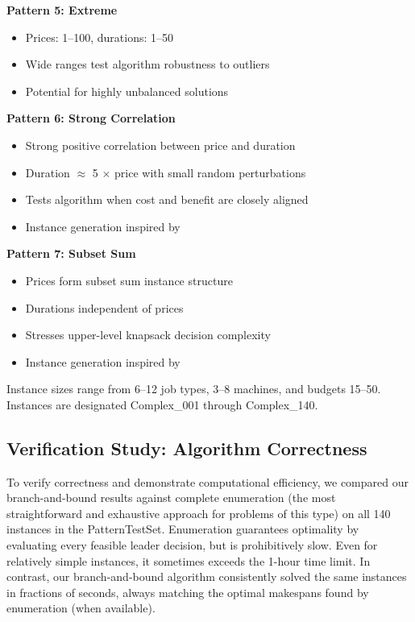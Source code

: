 \textbf{Pattern 5: Extreme}
\begin{itemize}
    \item Prices: 1--100, durations: 1--50
    \item Wide ranges test algorithm robustness to outliers
    \item Potential for highly unbalanced solutions
\end{itemize}

\textbf{Pattern 6: Strong Correlation}
\begin{itemize}
    \item Strong positive correlation between price and duration
    \item Duration $\approx$ 5 $\times$ price with small random perturbations
    \item Tests algorithm when cost and benefit are closely aligned
    \item Instance generation inspired by~\cite{weninger2025bilevel,pisinger2005hard}
\end{itemize}

\textbf{Pattern 7: Subset Sum}
\begin{itemize}
    \item Prices form subset sum instance structure
    \item Durations independent of prices
    \item Stresses upper-level knapsack decision complexity
    \item Instance generation inspired by~\cite{weninger2025bilevel,pisinger2005hard}
\end{itemize}

\noindent Instance sizes range from 6--12 job types, 3--8 machines, and budgets 15--50. Instances are designated Complex\_001 through Complex\_140.


\subsection{Verification Study: Algorithm Correctness}

To verify correctness and demonstrate computational efficiency, we compared our branch-and-bound results against complete enumeration (the most straightforward and exhaustive approach for problems of this type) on all 140 instances in the PatternTestSet. Enumeration guarantees optimality by evaluating every feasible leader decision, but is prohibitively slow. Even for relatively simple instances, it sometimes exceeds the 1-hour time limit. In contrast, our branch-and-bound algorithm consistently solved the same instances in fractions of seconds, always matching the optimal makespans found by enumeration (when available).

